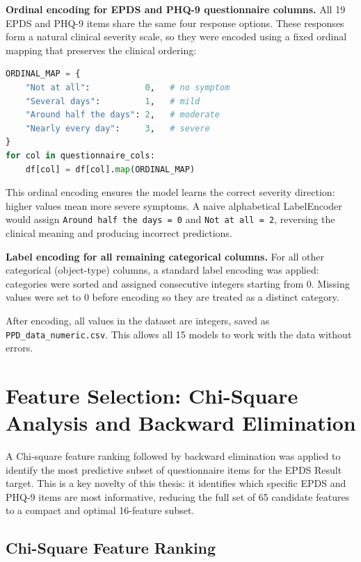 \textbf{Ordinal encoding for EPDS and PHQ-9 questionnaire columns.}
All 19 EPDS and PHQ-9 items share the same four response options. These responses form a natural clinical severity scale, so they were encoded using a fixed ordinal mapping that preserves the clinical ordering:

\begin{lstlisting}[language=Python, caption={Ordinal encoding for EPDS/PHQ-9 questionnaire columns.}]
ORDINAL_MAP = {
    "Not at all":           0,   # no symptom
    "Several days":         1,   # mild
    "Around half the days": 2,   # moderate
    "Nearly every day":     3,   # severe
}
for col in questionnaire_cols:
    df[col] = df[col].map(ORDINAL_MAP)
\end{lstlisting}

This ordinal encoding ensures the model learns the correct severity direction: higher values mean more severe symptoms. A naive alphabetical LabelEncoder would assign \texttt{Around half the days = 0} and \texttt{Not at all = 2}, reversing the clinical meaning and producing incorrect predictions.

\textbf{Label encoding for all remaining categorical columns.}
For all other categorical (object-type) columns, a standard label encoding was applied: categories were sorted and assigned consecutive integers starting from 0. Missing values were set to 0 before encoding so they are treated as a distinct category.

After encoding, all values in the dataset are integers, saved as \texttt{PPD\_data\_numeric.csv}. This allows all 15 models to work with the data without errors.

\section{Feature Selection: Chi-Square Analysis and Backward Elimination}
\label{ch3-sec-featuresel}

A Chi-square feature ranking followed by backward elimination was applied to identify the most predictive subset of questionnaire items for the EPDS Result target. This is a key novelty of this thesis: it identifies which specific EPDS and PHQ-9 items are most informative, reducing the full set of 65 candidate features to a compact and optimal 16-feature subset.

\subsection{Chi-Square Feature Ranking}

